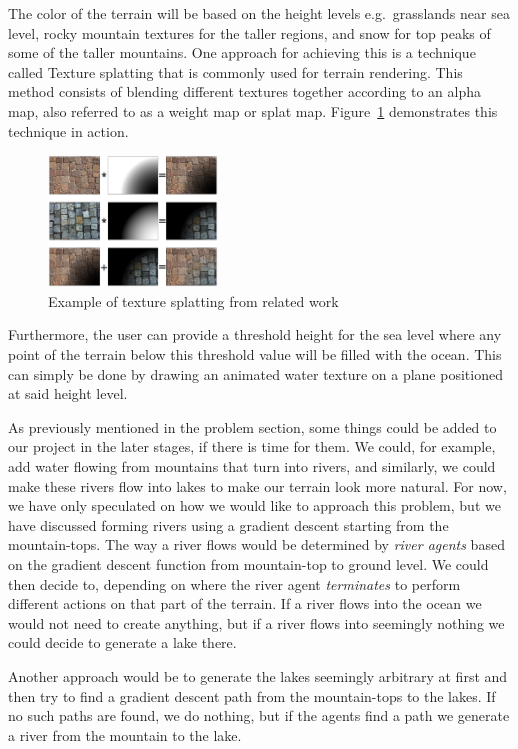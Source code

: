The color of the terrain will be based on the height levels e.g.\ grasslands near sea level, rocky mountain textures for the taller regions, and snow for top peaks of some of the taller mountains.
One approach for achieving this is a technique called Texture splatting that is commonly used for terrain rendering.
This method consists of blending different textures together according to an alpha map, also referred to as a weight map or splat map.
Figure~\ref{fig:texture-splatting} demonstrates this technique in action.

\begin{figure}[H]
  \centering
  \includegraphics[width=0.4\textwidth]{figure/texture-splatting.png}
  \caption{Example of texture splatting from related work \cite{wiki:texture-splatting-img}}
  \label{fig:texture-splatting}
\end{figure}

Furthermore, the user can provide a threshold height for the sea level where any point of the terrain below this threshold value will be filled with the ocean. 
This can simply be done by drawing an animated water texture on a plane positioned at said height level. 

As previously mentioned in the problem section, some things could be added to our project in the later stages, if there is time for them. 
We could, for example, add water flowing from mountains that turn into rivers, and similarly, we could make these rivers flow into lakes to make our terrain look more natural.
For now, we have only speculated on how we would like to approach this problem, but we have discussed forming rivers using a gradient descent starting from the mountain-tops.
The way a river flows would be determined by \textit{river agents} based on the gradient descent function from mountain-top to ground level. 
We could then decide to, depending on where the river agent \textit{terminates}  to perform different actions on that part of the terrain.
If a river flows into the ocean we would not need to create anything, but if a river flows into seemingly nothing we could decide to generate a lake there. 

Another approach would be to generate the lakes seemingly arbitrary at first and then try to find a gradient descent path from the mountain-tops to the lakes.
If no such paths are found, we do nothing, but if the agents find a path we generate a river from the mountain to the lake. 

